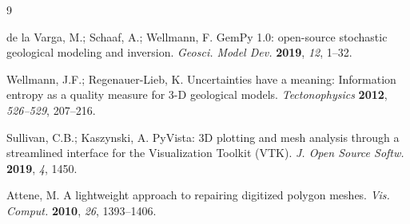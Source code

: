 \documentclass[11pt,a4paper]{article}
\begin{document}
\begin{thebibliography}{9}

de la Varga, M.; Schaaf, A.; Wellmann, F.
GemPy 1.0: open-source stochastic geological modeling and inversion.
\emph{Geosci. Model Dev.} \textbf{2019}, \emph{12}, 1--32.

Wellmann, J.F.; Regenauer-Lieb, K.
Uncertainties have a meaning: Information entropy as a quality measure for
3-D geological models.
\emph{Tectonophysics} \textbf{2012}, \emph{526--529}, 207--216.

Sullivan, C.B.; Kaszynski, A.
PyVista: 3D plotting and mesh analysis through a streamlined interface for
the Visualization Toolkit (VTK).
\emph{J. Open Source Softw.} \textbf{2019}, \emph{4}, 1450.

Attene, M.
A lightweight approach to repairing digitized polygon meshes.
\emph{Vis. Comput.} \textbf{2010}, \emph{26}, 1393--1406.

\end{thebibliography}
\end{document}
